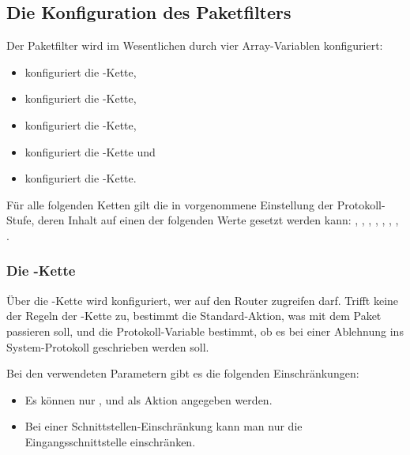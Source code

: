 \subsection{Die Konfiguration des Paketfilters}

Der Paketfilter wird im Wesentlichen durch vier Array-Variablen konfiguriert:

\begin{itemize}
  \item {} konfiguriert die -Kette,
  \item {} konfiguriert die -Kette,
  \item {} konfiguriert die -Kette,
  \item {} konfiguriert die -Kette und
  \item {} konfiguriert die -Kette.
\end{itemize}

 Für alle folgenden Ketten
gilt die in  vorgenommene Einstellung der
Protokoll-Stufe, deren Inhalt auf einen der folgenden Werte gesetzt werden
kann: , , ,
, , , ,
.

\subsubsection{Die -Kette}

Über die -Kette wird konfiguriert, wer auf den Router zugreifen
darf. Trifft keine der Regeln der -Kette zu, bestimmt die
Standard-Aktion, was mit dem Paket passieren soll, und die Protokoll-Variable
bestimmt, ob es bei einer Ablehnung ins System-Protokoll geschrieben werden soll.

Bei den verwendeten Parametern gibt es die folgenden Einschränkungen:
\begin{itemize}
  \item Es können nur ,  und 
    als Aktion angegeben werden.
  \item Bei einer Schnittstellen-Einschränkung kann man nur die
    Eingangsschnittstelle einschränken.
\end{itemize}

